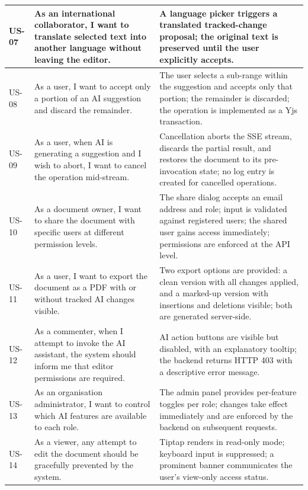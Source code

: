 \documentclass{article}
\begin{document}
{\begin{tabularx}{\textwidth}{|>{\hsize=0.3\hsize\raggedright\arraybackslash}X|>{\hsize=1.2\hsize\raggedright\arraybackslash}X|>{\hsize=1.5\hsize\raggedright\arraybackslash}X|}
    US-07 &
    As an international collaborator, I want to translate selected text into another language without leaving the editor. &
    A language picker triggers a translated tracked-change proposal; the original text is preserved until the user explicitly accepts. \\
    \hline
    US-08 &
    As a user, I want to accept only a portion of an AI suggestion and discard the remainder. &
    The user selects a sub-range within the suggestion and accepts only that portion; the remainder is discarded; the operation is implemented as a Yjs transaction. \\
    \hline
    US-09 &
    As a user, when AI is generating a suggestion and I wish to abort, I want to cancel the operation mid-stream. &
    Cancellation aborts the SSE stream, discards the partial result, and restores the document to its pre-invocation state; no log entry is created for cancelled operations. \\
    \hline
    US-10 &
    As a document owner, I want to share the document with specific users at different permission levels. &
    The share dialog accepts an email address and role; input is validated against registered users; the shared user gains access immediately; permissions are enforced at the API level. \\
    \hline
    US-11 &
    As a user, I want to export the document as a PDF with or without tracked AI changes visible. &
    Two export options are provided: a clean version with all changes applied, and a marked-up version with insertions and deletions visible; both are generated server-side. \\
    \hline
    US-12 &
    As a commenter, when I attempt to invoke the AI assistant, the system should inform me that editor permissions are required. &
    AI action buttons are visible but disabled, with an explanatory tooltip; the backend returns HTTP 403 with a descriptive error message. \\
    \hline
    US-13 &
    As an organisation administrator, I want to control which AI features are available to each role. &
    The admin panel provides per-feature toggles per role; changes take effect immediately and are enforced by the backend on subsequent requests. \\
    \hline
    US-14 &
    As a viewer, any attempt to edit the document should be gracefully prevented by the system. &
    Tiptap renders in read-only mode; keyboard input is suppressed; a prominent banner communicates the user's view-only access status. \\
    \hline
\end{tabularx}
}
\end{document}
